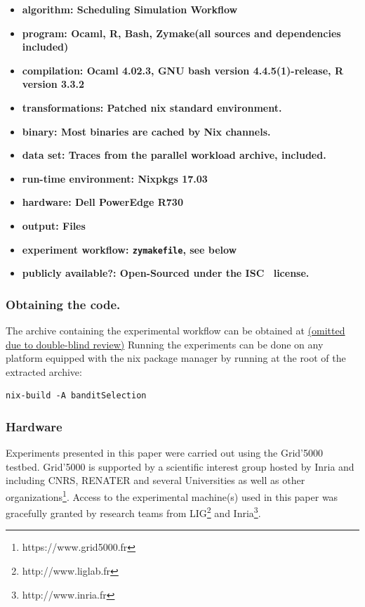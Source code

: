 \documentclass[sigconf,anonymous]{acmart}
\begin{document}
{\small
\begin{itemize}
  \item {\bf algorithm: Scheduling Simulation Workflow}
  \item {\bf program: Ocaml, R, Bash, Zymake(all sources and dependencies included)}
  \item {\bf compilation: Ocaml 4.02.3, GNU bash version 4.4.5(1)-release, R version 3.3.2}
  \item {\bf transformations: Patched nix standard environment.}
  \item {\bf binary: Most binaries are cached by Nix channels.}
  \item {\bf data set: Traces from the parallel workload archive, included.}
  \item {\bf run-time environment: Nixpkgs 17.03}
  \item {\bf hardware: Dell PowerEdge R730}
  \item {\bf output: Files}
  \item {\bf experiment workflow: \lstinline[basicstyle=\ttfamily\color{blue}]|zymakefile|, see below}
  \item {\bf publicly available?: Open-Sourced under the ISC~\cite{isc} license.}
\end{itemize}
}

\subsubsection{Obtaining the code.}

The archive containing the experimental workflow can be obtained at
\url{(omitted due to double-blind review)} Running the experiments can be done
on any platform equipped with the nix package manager by running at the root of
the extracted archive:

\begin{lstlisting}
nix-build -A banditSelection
\end{lstlisting}

\subsubsection{Hardware}

 Experiments presented in this paper were carried out using the Grid'5000
 testbed. Grid'5000 is supported by a scientific interest group hosted by Inria
 and including CNRS, RENATER and several Universities as well as other
 organizations\footnote{https://www.grid5000.fr}.  Access to the experimental
 machine(s) used in this paper was gracefully granted by research teams from
 LIG\footnote{http://www.liglab.fr} and Inria\footnote{http://www.inria.fr}.
\end{document}
